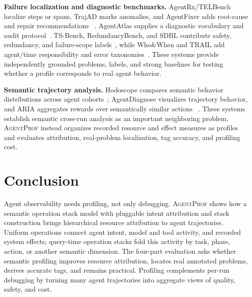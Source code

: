\documentclass[letterpaper]{article}
\newcommand{\sys}{\textsc{AgentProf}\xspace}
\begin{document}
\textbf{Failure localization and diagnostic benchmarks.}
AgentRx/TELBench localize steps or spans, TrajAD marks anomalies, and AgentFixer
adds root-cause and repair recommendations
~\cite{agentrx,telbench,trajad,agentfixer}. AgentAtlas supplies a
diagnostic vocabulary and audit protocol~\cite{agentatlas}. TS-Bench,
RedundancyBench, and SDBL contribute safety, redundancy, and failure-scope
labels~\cite{toolsafe,redundancybench,sdbl}, while Who\&When and TRAIL add
agent/time responsibility and error taxonomies~\cite{whowhen,trail}.
These systems provide independently grounded problems, labels, and strong
baselines for testing whether a profile corresponds to real agent behavior.

\textbf{Semantic trajectory analysis.}
Hodoscope compares semantic behavior distributions across agent
cohorts~\cite{hodoscope}; AgentDiagnose visualizes trajectory behavior, and ARIA
aggregates rewards over semantically similar actions
~\cite{agentdiagnose,aria}. These systems establish semantic cross-run analysis
as an important neighboring problem. \sys{} instead organizes recorded
resource and effect measures as profiles and evaluates attribution,
real-problem localization, tag accuracy, and profiling cost.

\section{Conclusion}

Agent observability needs profiling, not only debugging. \sys{} shows how a
semantic operation stack model with pluggable intent attribution and stack
construction brings hierarchical resource attribution to agent trajectories.
Uniform operations connect agent intent, model and tool activity, and recorded
system effects; query-time operation stacks fold this activity by task, phase,
action, or another semantic dimension. The four-part evaluation asks whether
semantic profiling improves resource attribution, locates real annotated
problems, derives accurate tags, and remains practical. Profiling complements
per-run debugging by turning many agent trajectories into aggregate views of
quality, safety, and cost.


\end{document}
